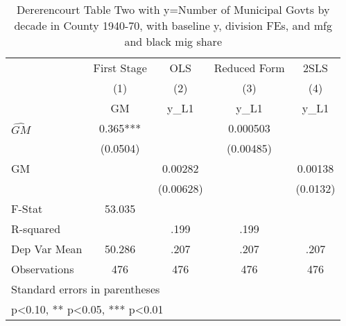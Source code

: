 \begin{table}[htbp]\centering
\def\sym#1{\ifmmode^{#1}\else\(^{#1}\)\fi}
\caption{Dererencourt Table Two with y=Number of Municipal Govts by decade in County 1940-70, with baseline y, division FEs, and mfg and black mig share}
\begin{tabular}{l*{4}{c}}
\toprule
                    & First Stage   &         OLS   &Reduced Form   &        2SLS   \\
                    &\multicolumn{1}{c}{(1)}&\multicolumn{1}{c}{(2)}&\multicolumn{1}{c}{(3)}&\multicolumn{1}{c}{(4)}\\
                    &\multicolumn{1}{c}{GM}&\multicolumn{1}{c}{y\_L1}&\multicolumn{1}{c}{y\_L1}&\multicolumn{1}{c}{y\_L1}\\
\midrule
$\hat{GM}$          &       0.365***&               &    0.000503   &               \\
                    &    (0.0504)   &               &   (0.00485)   &               \\
\addlinespace
GM                  &               &     0.00282   &               &     0.00138   \\
                    &               &   (0.00628)   &               &    (0.0132)   \\
\midrule
F-Stat              &      53.035   &               &               &               \\
R-squared           &               &        .199   &        .199   &               \\
Dep Var Mean        &      50.286   &        .207   &        .207   &        .207   \\
Observations        &         476   &         476   &         476   &         476   \\
\bottomrule
\multicolumn{5}{l}{\footnotesize Standard errors in parentheses}\\
\multicolumn{5}{l}{\footnotesize * p<0.10, ** p<0.05, *** p<0.01}\\
\end{tabular}
\end{table}
